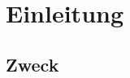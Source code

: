 \documentclass[11pt,a4paper]{article}
\begin{document}
 \newpage
 
 
 
 

%
%
%


\section{Einleitung}%



 	\subsection{Zweck} %
	
\end{document}
